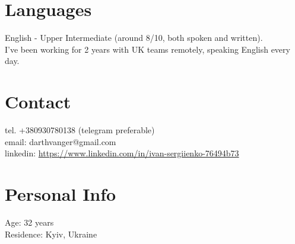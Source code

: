 \documentclass[a4paper, 14pt]{article}
\begin{document}
\section{Languages}
	English - Upper Intermediate (around 8/10, both spoken and written). \\
  I've been working for 2 years with UK teams remotely, speaking English every day.

\section{Contact}
	tel. +380930780138 (telegram preferable) \\
	email: darthvanger@gmail.com \\
  linkedin: \url{https://www.linkedin.com/in/ivan-sergiienko-76494b73} \\

\section{Personal Info}
	Age: 32 years \\
  Residence: Kyiv, Ukraine
\end{document}
